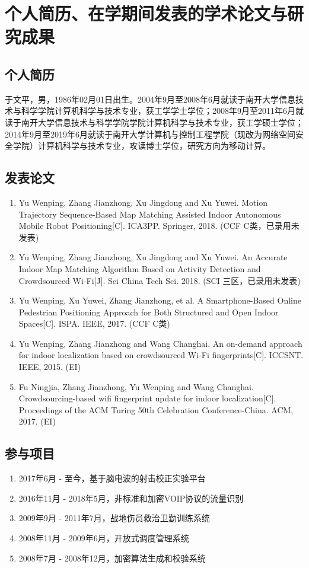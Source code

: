 

\chapter*{个人简历、在学期间发表的学术论文与研究成果}
\section*{个人简历}
于文平，男，1986年02月01日出生。2004年9月至2008年6月就读于南开大学信息技术与科学学院计算机科学与技术专业，获工学学士学位；2008年9月至2011年6月就读于南开大学信息技术与科学学院学院计算机科学与技术专业，获工学硕士学位；2014年9月至2019年6月就读于南开大学计算机与控制工程学院（现改为网络空间安全学院）计算机科学与技术专业，攻读博士学位，研究方向为移动计算。
\section*{发表论文}
\begin{enumerate}
\renewcommand{\labelenumi}{[\theenumi]}
\item Yu Wenping, Zhang Jianzhong, Xu Jingdong and Xu Yuwei. Motion Trajectory Sequence-Based Map Matching Assisted Indoor Autonomous Mobile Robot Positioning[C]. ICA3PP. Springer, 2018. (CCF C类，已录用未发表)
\item Yu Wenping, Zhang Jianzhong, Xu Jingdong and Xu Yuwei. An Accurate Indoor Map Matching Algorithm Based on Activity Detection and Crowdsourced Wi-Fi[J]. Sci China Tech Sci. 2018. (SCI 三区，已录用未发表)
\item Yu Wenping, Xu Yuwei, Zhang Jianzhong, et al. A Smartphone-Based Online Pedestrian Positioning Approach for Both Structured and Open Indoor Spaces[C]. ISPA. IEEE, 2017. (CCF C类)
\item Yu Wenping, Zhang Jianzhong and Wang Changhai. An on-demand approach for indoor localization based on crowdsourced Wi-Fi fingerprints[C]. ICCSNT. IEEE, 2015. (EI)
\item Fu Ningjia, Zhang Jianzhong, Yu Wenping and Wang Changhai. Crowdsourcing-based wifi fingerprint update for indoor localization[C]. Proceedings of the ACM Turing 50th Celebration Conference-China. ACM, 2017. (EI)
\end{enumerate}
\section*{参与项目}
\begin{enumerate}
\renewcommand{\labelenumi}{[\theenumi]}
\item 2017年6月 - 至今，基于脑电波的射击校正实验平台
\item 2016年11月 - 2018年5月，非标准和加密VOIP协议的流量识别
\item 2009年9月 - 2011年7月，战地伤员救治卫勤训练系统
\item 2008年11月 - 2009年6月，开放式调度管理系统
\item 2008年7月 - 2008年12月，加密算法生成和校验系统
\end{enumerate}
